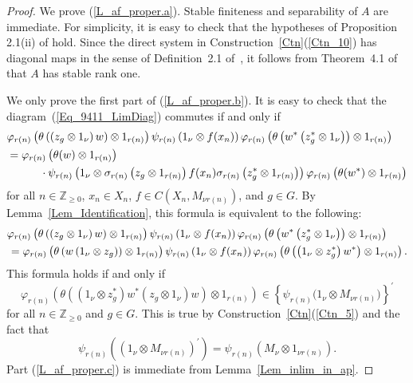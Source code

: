 \documentclass[10pt]{amsart}
\numberwithin{equation}{section}
\theoremstyle{definition}
\newcommand{\Nz}{{\mathbb{Z}}_{\geq 0}}
\begin{document}
\begin{proof}
We prove (\ref{L_af_proper.a}).
Stable finiteness and separability of $A$ are immediate.
For simplicity, it is easy to check that
the hypotheses of Proposition 2.1(ii) of \cite{DNN92} hold.
Since the direct system in
Construction~\ref{Ctn}(\ref{Ctn_10})
has diagonal maps in the sense of Definition~2.1 of~\cite{ElHoTm}, it follows from Theorem~4.1 of~\cite{ElHoTm}
that $A$ has stable rank one.
%

We only prove the first part of (\ref{L_af_proper.b}). 
It is easy to check that 
the diagram~(\ref{Eq_9411_LimDiag}) commutes if and only if 
\begin{align*}
&
\varphi_{r(n)} \left(\theta \left(\left(z_g  \otimes 1_{\nu}\right )w\right) \otimes 1_{r(n)} \right)  
\psi_{r(n)}\left(1_{\nu} \otimes f (x_n)\right)
 \varphi_{r(n)} \left(\theta \left(w^*\left(z^*_g  \otimes 1_{\nu}\right )\right) \otimes 1_{r(n)} \right)  
 \\\notag 
 &  \hspace*{0em} {\mbox{}}
  =
\varphi_{r(n)} \left(\theta (w) \otimes 1_{r(n)} \right) 
\\\notag 
 &  \hspace*{3em} {\mbox{}} \cdot 
 \psi_{r(n)} \left(1_{\nu} \otimes \sigma_{r(n)} \left(z_g \otimes 1_{r(n)}\right) f(x_n) \sigma_{r(n)} \left(z^*_g \otimes 1_{r(n)}\right) \right)
\varphi_{r(n)} \left(\theta (w^*) \otimes 1_{r(n)} \right) 
\end{align*}
for all $n\in \Nz$, $x_n \in X_n$, $f\in C (X_{n}, M_{\nu r(n)})$, and  $g \in G$. 
By Lemma~\ref{Lem_Identification}, this formula is equivalent to the following:
\begin{align*}
&
\varphi_{r(n)} \left(\theta \left(\left(z_g  \otimes 1_{\nu}\right )w\right) \otimes 1_{r(n)} \right)  
\psi_{r(n)}\left(1_{\nu} \otimes f (x_n)\right)
 \varphi_{r(n)} \left(\theta \left(w^* \left(z^*_g  \otimes 1_{\nu}\right )\right) \otimes 1_{r(n)} \right) 
 \\\notag 
 &  \hspace*{.1em} {\mbox{}}
  =
\varphi_{r(n)} 
\left(
\theta \left(w \left(1_\nu \otimes z_g\right)\right) \otimes 1_{r(n)} 
\right)
 \psi_{r(n)} \left(  1_{\nu} \otimes f(x_n)  \right)
\varphi_{r(n)} 
\left(
\theta \left( \left(1_\nu \otimes z^*_g\right)w^*\right) \otimes 1_{r(n)}
\right). 
\end{align*}
This formula holds if and only if 
\[
\varphi_{r(n)} \left( \theta \left( (1_\nu \otimes z^*_g)w^*(z_g \otimes 1_\nu)w \right) \otimes 1_{r(n)}\right)
\in \left\{ 
\psi_{r(n)} \big(1_{\nu} \otimes M_{\nu r(n)}\big) \right\}^{'}
\]
for all $n \in \Nz$ and $g \in G$. 
This is true by Construction~\ref{Ctn}(\ref{Ctn_5}) and the fact that 
\[
\psi_{r(n)} \left((1_{\nu} \otimes M_{\nu r(n)})^{'}\right)=\psi_{r(n)}\left( M_{\nu} \otimes 1_{\nu r(n)}\right).
\]
%
Part (\ref{L_af_proper.c}) is immediate from Lemma~\ref{Lem_inlim_in_ap}. 


\end{proof}
\end{document}
